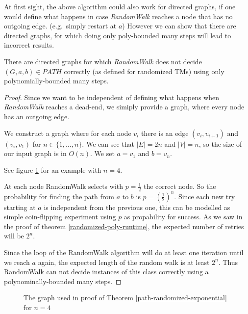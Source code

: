 At first sight, the above algorithm could also work for directed graphs,
if one would define what happens in case \emph{RandomWalk} reaches a
node that has no outgoing edge. (e.g.~simply restart at $a$) However we
can show that there are directed graphs, for which doing only
poly-bounded many steps will lead to incorrect results.

\vspace{0.5cm}

\begin{thm}
\label{path-randomized-exponential}
There are directed graphs for which {\em RandomWalk} does not decide $(G, a, b) \in PATH$ correctly
(as defined for randomized TMs) using only polynomially-bounded many steps.
\end{thm}

\begin{proof}
Since we want to be independent of defining what happens when {\em RandomWalk} reaches a dead-end,
we simiply provide a graph, where every node has an outgoing edge.

We construct a graph where for each node $v_i$ there is an edge $(v_i, v_{i+1})$ and $(v_i, v_1)$ for $n \in \{ 1, \dots, n \}$.
We can see that $|E| = 2n$ and $|V| = n$, so the size of our input graph is in $O(n)$. We set $a = v_1$ and $b = v_n$.

See figure \ref{graph-randomized} for an example with $n=4$.

At each node RandomWalk selects with $p = \frac{1}{2}$ the correct node. So the probability for finding the path
from $a$ to $b$ is $p = \left(\frac{1}{2}\right)^n$. Since each new try starting at $a$ is independent from the previous
one, this can be modelled as simple coin-flipping experiment using $p$ as propability for success.
As we saw in the proof of theorem \ref{randomized-poly-runtime}, the expected number of retries will be $2^n$.

Since the loop of the RandomWalk algorithm will do at least one iteration until
we reach $a$ again, the expected length of the random walk is at least $2^n$.
Thus RandomWalk can not decide instances of this class correctly using a polynominally-bounded many steps.
\end{proof}

\begin{figure}
\caption{The graph used in proof of Theorem \ref{path-randomized-exponential} for $n=4$}
\label{graph-randomized}
\end{figure}

